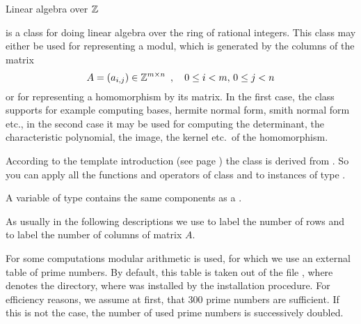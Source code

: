 

\NAME

 \dotfill Linear algebra over $\mathbb{Z}$



\ABSTRACT

 is a class for doing linear algebra over the ring of rational integers.
This class may either be used for representing a modul, which is generated by the columns of the
matrix
\begin{displaymath}
  A = (a_{i,j}) \in \mathbb{Z}^{m\times n} \enspace,\quad 0 \leq i < m,\, 0 \leq j < n
\end{displaymath}
or for representing a homomorphism by its matrix.  In the first case, the class supports for
example computing bases, hermite normal form, smith normal form etc., in the second case it may
be used for computing the determinant, the characteristic polynomial, the image, the kernel
etc.~of the homomorphism.

According to the template introduction (see page \pageref{template_introduction2}) the class
 is derived from .  So you can apply all the
functions and operators of class  and 
to instances of type .



\DESCRIPTION

A variable of type  contains the same components as a .

As usually in the following descriptions we use  to label the number of rows and
 to label the number of columns of matrix $A$.

For some computations modular arithmetic is used, for which we use an external table of prime
numbers.  By default, this table is taken out of the file
, where  denotes the
directory, where \LiDIA was installed by the installation procedure.  For efficiency reasons, we
assume at first, that 300 prime numbers are sufficient.  If this is not the case, the number of
used prime numbers is successively doubled.

